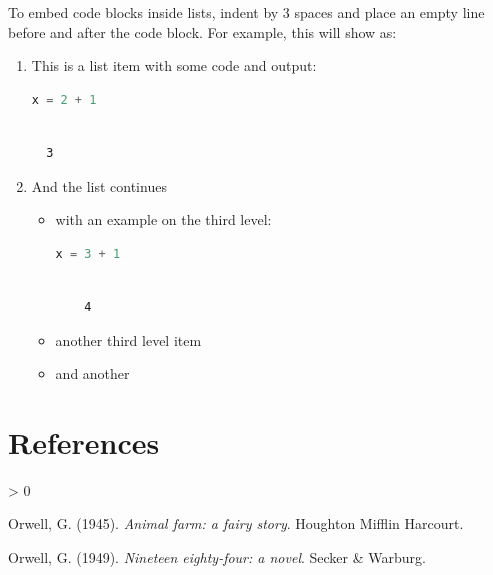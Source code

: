 \documentclass[
  notoc %
]{tufte-book}
\newlength{\cslhangindent}
\newenvironment{CSLReferences}[2] %
 {%
  \setlength{\parindent}{0pt}
  \ifodd #1 \everypar{\setlength{\hangindent}{\cslhangindent}}\ignorespaces\fi
  \ifnum #2 > 0
  \setlength{\parskip}{#2\baselineskip}
  \fi
 }%
 {}
\begin{document}
To embed code blocks inside lists, indent by 3 spaces and place an empty
line before and after the code block. For example, this will show as:

\begin{enumerate}
\def\labelenumi{\arabic{enumi}.}
\item
  This is a list item with some code and output:

  \begin{lstlisting}[language=Julia]
  x = 2 + 1
  \end{lstlisting}

  \begin{lstlisting}[language=Output]

  3

  \end{lstlisting}
\item
  And the list continues

  \begin{itemize}
  \item
    with an example on the third level:

    \begin{lstlisting}[language=Julia]
    x = 3 + 1
    \end{lstlisting}

    \begin{lstlisting}[language=Output]

    4

    \end{lstlisting}
  \item
    another third level item
  \item
    and another
  \end{itemize}
\end{enumerate}

\hypertarget{references}{%
\chapter*{References}\label{references}}

\hypertarget{refs}{}
\begin{CSLReferences}{1}{0}
\leavevmode{}%
Orwell, G. (1945). \emph{{Animal farm: a fairy story}}. Houghton Mifflin
Harcourt.

\leavevmode{}%
Orwell, G. (1949). \emph{{Nineteen eighty-four: a novel}}. Secker \&
Warburg.

\end{CSLReferences}

\backmatter
\end{document}
